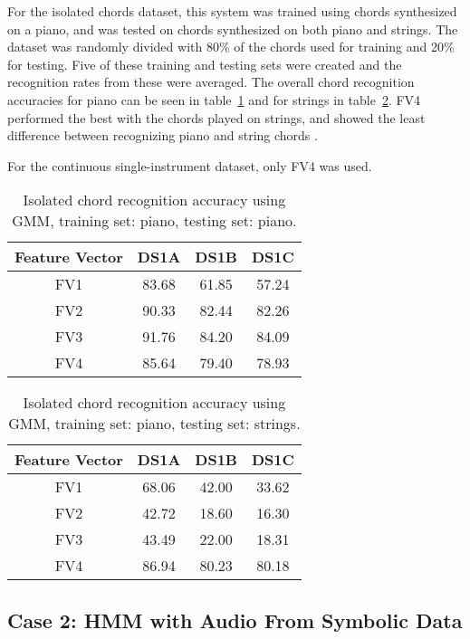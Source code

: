\documentclass{sig-alternate}
\begin{document}
For the isolated chords dataset, this system was trained using chords synthesized on a piano, and was tested on chords synthesized on both piano and strings. The dataset was randomly divided with 80\% of the chords used for training and 20\% for testing. Five of these training and testing sets were created and the recognition rates from these were averaged. The overall chord recognition accuracies for piano can be seen in table~\ref{tab:tab3} and for strings in table~\ref{tab:tab4}. FV4 performed the best with the chords played on strings, and showed the least difference between recognizing piano and string chords \cite{Morman:2006}.

For the continuous single-instrument dataset, only FV4 was used.


\begin{table}
\centering
\begin{tabular}{|c|c|c|c|} \hline
Feature Vector & DS1A & DS1B & DS1C \\ \hline
FV1 & 83.68 & 61.85 & 57.24 \\ \hline
FV2 & 90.33 & 82.44 & 82.26 \\ \hline
FV3 & 91.76 & 84.20 & 84.09 \\ \hline
FV4 & 85.64 & 79.40 & 78.93 \\ \hline
\end{tabular}
\caption{Isolated chord recognition accuracy using GMM, training set: piano, testing set: piano.}
\label{tab:tab3}
\end{table} 

\begin{table}
\centering
\begin{tabular}{|c|c|c|c|} \hline
Feature Vector & DS1A & DS1B & DS1C \\ \hline
FV1 & 68.06 & 42.00 & 33.62 \\ \hline
FV2 & 42.72 & 18.60 & 16.30 \\ \hline
FV3 & 43.49 & 22.00 & 18.31 \\ \hline
FV4 & 86.94 & 80.23 & 80.18 \\ \hline
\end{tabular}
\caption{Isolated chord recognition accuracy using GMM, training set: piano, testing set: strings.}
\label{tab:tab4}
\end{table}



\subsection{Case 2: HMM with Audio From Symbolic Data}
\end{document}
